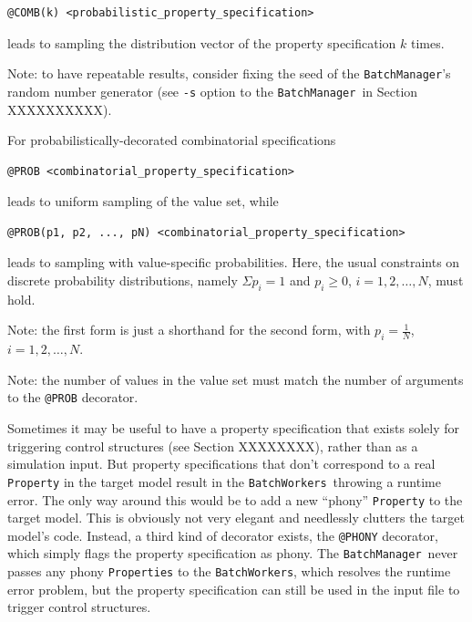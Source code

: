 \documentclass{article}
\newcommand{\BM}{{\tt BatchManager}}
\newcommand{\BWs}{{\tt BatchWorkers}}
\begin{document}
\begin{lstlisting}[]
  @COMB(k) <probabilistic_property_specification>
\end{lstlisting}

leads to sampling the distribution vector of the property specification $k$ times.

\begin{sideblock}
Note: to have repeatable results, consider fixing the seed of the \BM's random number generator (see {\tt -s} option to the \BM\ in Section XXXXXXXXXX).
\end{sideblock}

For probabilistically-decorated combinatorial specifications

\begin{lstlisting}[]
  @PROB <combinatorial_property_specification>
\end{lstlisting}

leads to uniform sampling of the value set, while

\begin{lstlisting}[]
  @PROB(p1, p2, ..., pN) <combinatorial_property_specification>
\end{lstlisting}

leads to sampling with value-specific probabilities. Here, the usual constraints on discrete probability distributions, namely $\Sigma{p_i} = 1$ and $p_i \geq 0$, $i = 1,2,\dots,N$, must hold.

\begin{sideblock}
Note: the first form is just a shorthand for the second form, with $p_i = \frac{1}{N}$, $i = 1,2,\dots,N$.
\end{sideblock}

\begin{sideblock}
Note: the number of values in the value set must match the number of arguments to the {\tt @PROB} decorator.
\end{sideblock}

Sometimes it may be useful to have a property specification that exists solely for triggering control structures (see Section XXXXXXXX), rather than as a simulation input. But property specifications that don't correspond to a real {\tt Property} in the target model result in the \BWs\ throwing a runtime error. The only way around this would be to add a new ``phony'' {\tt Property} to the target model. This is obviously not very elegant and needlessly clutters the target model's code. Instead, a third kind of decorator exists, the {\tt @PHONY} decorator, which simply flags the property specification as phony. The \BM\ never passes any phony {\tt Properties} to the \BWs, which resolves the runtime error problem, but the property specification can still be used in the input file to trigger control structures.
\end{document}
